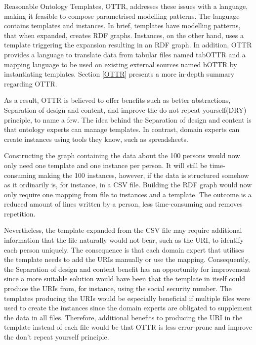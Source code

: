 \para
Reasonable Ontology Templates, OTTR\cite{OTTR_online}, addresses these issues with a language, making it feasible to compose parametrised modelling patterns. The language contains templates and instances. In brief, templates have modelling patterns, that when expanded, creates RDF graphs. Instances, on the other hand, uses a template triggering the expansion resulting in an RDF graph. In addition, OTTR provides a language to translate data from tabular files named tabOTTR\cite{OTTR_tabOTTR} and a mapping language to be used on existing external sources named bOTTR \cite{OTTR_bOTTR} by instantiating templates. Section \ref{OTTR} presents a more in-depth summary regarding OTTR.

\para
As a result, OTTR is believed to offer benefits such as better abstractions, Separation of design and content, and improve the do not repeat yourself(DRY) principle, to name a few\cite{OTTR_online_benefits}. The idea behind the Separation of design and content is that ontology experts can manage templates. In contrast, domain experts can create instances using tools they know, such as spreadsheets\cite{OTTR_online_benefits}. 

\para
Constructing the graph containing the data about the 100 persons would now only need one template and one instance per person. It will still be time-consuming making the 100 instances, however, if the data is structured somehow as it ordinarily is, for instance, in a CSV file. Building the RDF graph would now only require one mapping from file to instances and a template. The outcome is a reduced amount of lines written by a person, less time-consuming and removes repetition. 

\para
Nevertheless, the template expanded from the CSV file may require additional information that the file naturally would not bear, such as the URI, to identify each person uniquely. The consequence is that each domain expert that utilises the template needs to add the URIs manually or use the mapping.  Consequently, the Separation of design and content benefit has an opportunity for improvement since a more suitable solution would have been that the template in itself could produce the URIs from, for instance, using the social security number. The templates producing the URIs would be especially beneficial if multiple files were used to create the instances since the domain experts are obligated to supplement the data in all files.  Therefore, additional benefits to producing the URI in the template instead of each file would be that OTTR is less error-prone and improve the don't repeat yourself principle.


